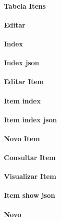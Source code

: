 \paragraph{Tabela Itens}

\paragraph{Editar}

\paragraph{Index}

\paragraph{Index json}

\paragraph{Editar Item}

\paragraph{Item index}

\paragraph{Item index json}

\paragraph{Novo Item}

\paragraph{Consultar Item}

\paragraph{Visualizar Item}

\paragraph{Item show json}

\paragraph{Novo}

